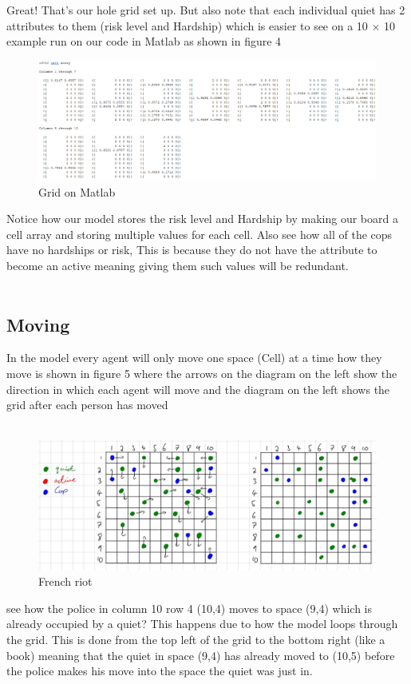 \documentclass[11pt]{article}
\begin{document}
	Great! That's our hole grid set up. But also note that each individual quiet has 2 attributes to them (risk level and Hardship) which is easier to see on a 10 $\times$ 10 example run on our code in Matlab as shown in figure 4\\
	\begin{figure}[H]
		\includegraphics[width=\linewidth]{Matlab 10 by 10 matrix example.png}
		\caption{Grid on Matlab}
		\label{fig:frenchriot}
	\end{figure}
	Notice how our model stores the risk level and Hardship by making our board a cell array and storing multiple values for each cell. Also see how all of the cops have no hardships or risk, This is because they do not have the attribute to become an active meaning giving them such values will be redundant.\\
	\\
	\subsection{Moving}
In the model every agent will only move one space (Cell) at a time how they move is shown in figure 5  where the arrows on the diagram on the left show the direction in which each agent will move and the diagram on the left shows the grid after each person has moved\\
	\\
	\begin{figure}[H]
		\includegraphics[width=\linewidth]{Movement visual.png}
		\caption{French riot}
		\label{fig:frenchriot}
	\end{figure}
	see how the police in column 10 row 4 (10,4) moves to space (9,4) which is already occupied by a quiet? This happens due to how the model loops through the grid. This is done from the top left of the grid to the bottom right (like a book) meaning that the quiet in space (9,4) has already moved to (10,5) before the police makes his move into the space the quiet was just in.
	\\
	\\
\end{document}
